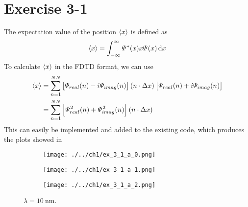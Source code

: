 \clearpage





\newpage
\section{Exercise 3-1}

The expectation value of the position $\braket{x}$ is defined as
\[
	\braket{x} = \int_{-\infty}^{\infty} \varPsi^{\ast}(x) x \varPsi(x) \dif x
\]
To calculate $\braket{x}$ in the FDTD format, we can use
\begin{align*}
	\braket{x} &= \sum_{n=1}^{NN} \left[ \varPsi_{real}(n) - i \varPsi_{imag}(n) \right] (n \cdot \Delta x) \left[ \varPsi_{real}(n) + i \varPsi_{imag}(n) \right] \\
	&= \sum_{n=1}^{NN} \left[ \varPsi^2_{real}(n) + \varPsi^2_{imag}(n) \right] (n \cdot \Delta x)
\end{align*}
This can easily be implemented and added to the existing code, which produces
the plots showed in 

\begin{figure}
	\centering
	\begin{subfigure}{1\linewidth}
		\texttt{[image: ./../ch1/ex\_3\_1\_a\_0.png]}
	\end{subfigure}
	
	\begin{subfigure}{1\linewidth}
		\texttt{[image: ./../ch1/ex\_3\_1\_a\_1.png]}
	\end{subfigure}
	
	\begin{subfigure}{1\linewidth}
		\texttt{[image: ./../ch1/ex\_3\_1\_a\_2.png]}
	\end{subfigure}
	
	\caption{$\lambda = \SI{10}{\nano\m}$.}
	\label{fig:ex_3_1_a}
\end{figure}
